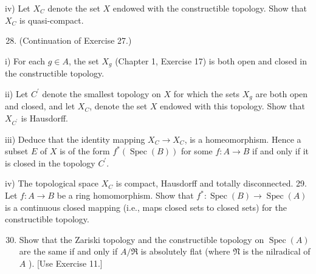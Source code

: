 \documentclass{standalone}
\theoremstyle{definition}
\theoremstyle{remark}
\begin{document}
iv) Let $X_{C}$ denote the set $X$ endowed with the constructible topology. Show that $X_{C}$ is quasi-compact.

\begin{enumerate}
  \setcounter{enumi}{27}
  \item (Continuation of Exercise 27.)
\end{enumerate}

i) For each $g \in A$, the set $X_{g}$ (Chapter 1, Exercise 17) is both open and closed in the constructible topology.

ii) Let $C^{\prime}$ denote the smallest topology on $X$ for which the sets $X_{g}$ are both open and closed, and let $X_{C}$, denote the set $X$ endowed with this topology. Show that $X_{C^{\prime}}$ is Hausdorff.

iii) Deduce that the identity mapping $X_{C} \rightarrow X_{C}$, is a homeomorphism. Hence a subset $E$ of $X$ is of the form $f^{*}(\operatorname{Spec}(B))$ for some $f: A \rightarrow B$ if and only if it is closed in the topology $C^{\prime}$.

iv) The topological space $X_{C}$ is compact, Hausdorff and totally disconnected. 29. Let $f: A \rightarrow B$ be a ring homomorphism. Show that $f^{*}: \operatorname{Spec}(B) \rightarrow \operatorname{Spec}(A)$ is a continuous closed mapping (i.e., maps closed sets to closed sets) for the constructible topology.

\begin{enumerate}
  \setcounter{enumi}{29}
  \item Show that the Zariski topology and the constructible topology on $\operatorname{Spec}(A)$ are the same if and only if $A / \mathfrak{R}$ is absolutely flat (where $\mathfrak{N}$ is the nilradical of $A$ ). [Use Exercise 11.]
\end{enumerate}
\end{document}
